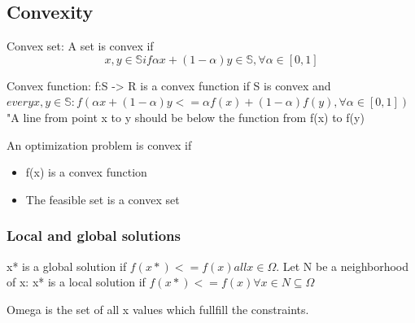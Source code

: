 \subsection{Convexity}
Convex set: A set is convex if
\begin{equation}
    x,y \in \mathbb{S} if \alpha x + (1-\alpha)y \in \mathbb{S}, \forall \alpha \in [0,1]
\end{equation}

Convex function: f:S -> R is a convex function if S is convex and
$every x,y \in \mathbb{S} : f(\alpha x + (1-\alpha)y <= \alpha f(x) + (1-\alpha)f(y) , \forall \alpha \in [0,1])$
"A line from point x to y should be below the function from f(x) to f(y)

An optimization problem is convex if
 \begin{itemize}
    \item f(x) is a convex function
    \item The feasible set is a convex set
 \end{itemize}

\subsubsection{Local and global solutions}
x* is a global solution if $f(x*) <= f(x) all x \in\Omega$.
Let N be a neighborhood of x:
x* is a local solution if $f(x*) <= f(x) \forall x \in N \subseteq \Omega$

Omega is the set of all x values which fullfill the constraints.